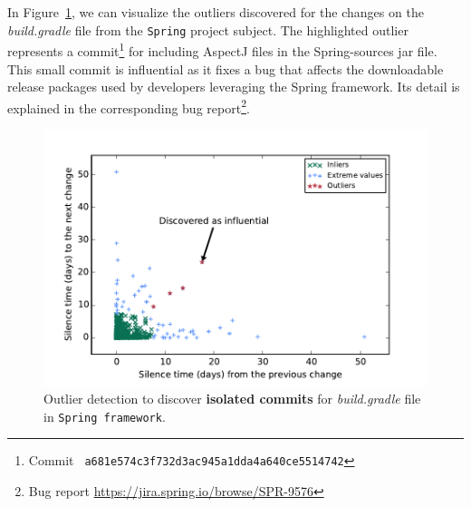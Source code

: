 In Figure~\ref{fig:build-gradle}, we can visualize the outliers discovered for
the changes on the {\it build.gradle} file from the {\tt Spring} project
subject. The highlighted outlier represents a commit\footnote{Commit \tt\small
a681e574c3f732d3ac945a1dda4a640ce5514742} for including AspectJ files in the
Spring-sources jar file. This small commit is influential as it
fixes a bug that affects the downloadable release packages used by developers
leveraging the Spring framework. Its detail is explained in the corresponding bug report\footnote{Bug report \url{https://jira.spring.io/browse/SPR-9576}}.


\begin{figure}[h!]
\centering
\includegraphics[width=0.6\linewidth]{fig/build-gradle.pdf}
\caption{Outlier detection to discover {\bf isolated commits} for {\it build.gradle} file in {\tt Spring framework}.}
\label{fig:build-gradle}
\end{figure}


%




